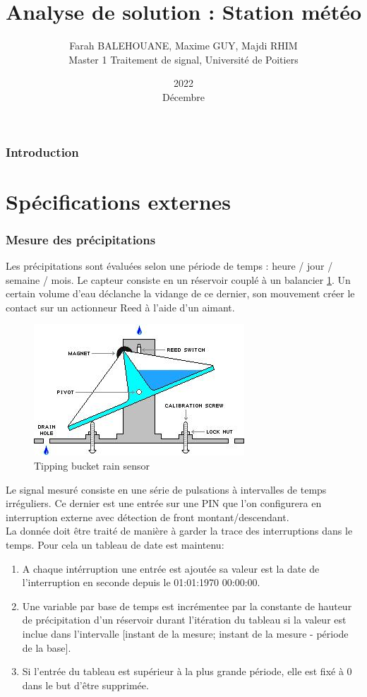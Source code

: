 \documentclass{article}
\title{Analyse de solution : Station météo }
\date{2022\\ Décembre}
\author{Farah BALEHOUANE, Maxime GUY, Majdi RHIM\\ Master 1 Traitement de signal, Université de Poitiers}
\begin{document}
    \maketitle
    \section{Introduction}
    \blindtext
    \pagebreak
    \tableofcontents
    \part{Spécifications externes}
        \section{Mesure des précipitations}
            Les précipitations sont évaluées selon une période de temps : heure / jour / semaine / mois.
            Le capteur consiste en un réservoir couplé à un balancier \ref{fig:rain-sensor}. Un certain volume d'eau déclanche la vidange de ce dernier, son mouvement créer le contact sur un actionneur Reed à l'aide d'un aimant.\\
            \begin{figure}[H]
                \centering
                \includegraphics[scale=0.5]{img/rain_sensor/tipping-bucket-rain-gauge.jpg}
                \caption{Tipping bucket rain sensor}  \label{fig:rain-sensor}
            \end{figure}
            Le signal mesuré consiste en une série de pulsations à intervalles de temps irréguliers.
            Ce dernier est une entrée sur une PIN que l'on configurera en interruption externe avec détection de front montant/descendant.\\
            La donnée doit être traité de manière à garder la trace des interruptions dans le temps. Pour cela un tableau de date est maintenu:\\
            \begin{enumerate}
                \item A chaque intérruption une entrée est ajoutée sa valeur est la date de l'interruption en seconde depuis le 01:01:1970 00:00:00.
                \item Une variable par base de temps est incrémentee par la constante de hauteur de précipitation d'un réservoir durant l'itération du tableau si la valeur est inclue dans l'intervalle [instant de la mesure; instant de la mesure - période de la base].
                \item Si l'entrée du tableau est supérieur à la plus grande période, elle est fixé à 0 dans le but d'être supprimée.
            \end{enumerate}
            
\end{document}

